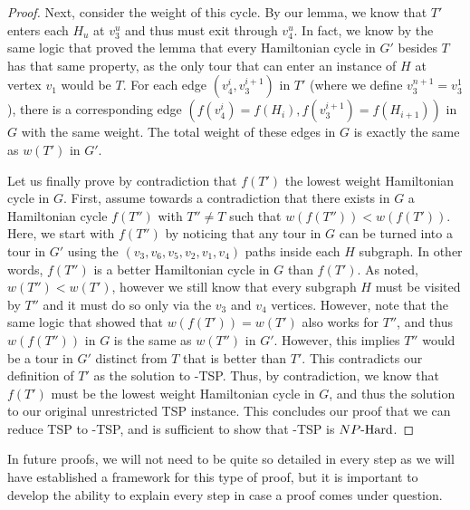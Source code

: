 \begin{proof}
Next, consider the weight of this cycle. By our lemma, we know that $T'$ enters each $H_u$ at $v_3^u$ and thus must exit through $v_4^u$. In fact, we know by the same logic that proved the lemma that every Hamiltonian cycle in $G'$ besides $T$ has that same property, as the only tour that can enter an instance of $H$ at vertex $v_1$ would be $T$. For each edge $(v_4^i, v_3^{i+1})$ in $T'$ (where we define $v_3^{n+1} = v_3^1$), there is a corresponding edge $(f(v_4^i) = f(H_i), f(v_3^{i+1}) = f(H_{i+1}))$ in $G$ with the same weight. The total weight of these edges in $G$ is exactly the same as $w(T')$ in $G'$.

Let us finally prove by contradiction that $f(T')$ the lowest weight Hamiltonian cycle in $G$. First, assume towards a contradiction that there exists in $G$ a Hamiltonian cycle $f(T'')$ with $T'' \neq T$ such that $w(f(T'')) < w(f(T'))$. Here, we start with $f(T'')$ by noticing that any tour in $G$ can be turned into a tour in $G'$ using the $(v_3,v_6,v_5,v_2,v_1,v_4)$ paths inside each $H$ subgraph. In other words, $f(T'')$ is a better Hamiltonian cycle in $G$ than $f(T')$. As noted, $w(T'') < w(T')$, however we still know that every subgraph $H$ must be visited by $T''$ and it must do so only via the $v_3$ and $v_4$ vertices. However, note that the same logic that showed that $w(f(T')) = w(T')$ also works for $T''$, and thus $w(f(T''))$ in $G$ is the same as $w(T'')$ in $G'$. However, this implies $T''$ would be a tour in $G'$ distinct from $T$ that is better than $T'$. This contradicts our definition of $T'$ as the solution to \inob{}-TSP. Thus, by contradiction, we know that $f(T')$ must be the lowest weight Hamiltonian cycle in $G$, and thus the solution to our original unrestricted TSP instance. This concludes our proof that we can reduce TSP to \inob{}-TSP, and is sufficient to show that \inob{}-TSP is ${NP\text{-Hard{}}}$.
\end{proof}
In future proofs, we will not need to be quite so detailed in every step as we will have established a framework for this type of proof, but it is important to develop the ability to explain every step in case a proof comes under question.


